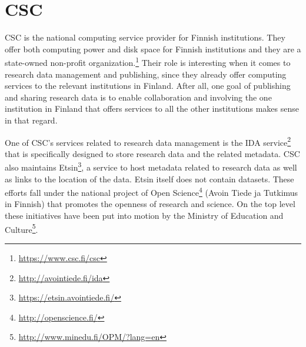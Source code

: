 \section{CSC}
\label{sec:csc}

CSC is the national computing service provider for Finnish institutions. They
offer both computing power and disk space for Finnish institutions and they
are a state-owned non-profit organization.\footnote{\url{https://www.csc.fi/csc}}
Their role is interesting when it comes to research data management and
publishing, since they already offer computing services to the relevant
institutions in Finland. After all, one goal of publishing and sharing
research data is to enable collaboration and involving the one institution
in Finland that offers services to all the other institutions makes sense in
that regard.

One of CSC's services related to research data management is the IDA
service\footnote{\url{http://avointiede.fi/ida}} that is specifically
designed to store research data and the related metadata. CSC also maintains
Etsin\footnote{\url{https://etsin.avointiede.fi/}}, a service to host
metadata related to research data as well as links to the location of the data.
Etsin itself does not contain datasets.
These efforts fall under the national project of Open
Science\footnote{\url{http://openscience.fi/}} (Avoin Tiede ja Tutkimus in
Finnish) that promotes the openness of research and science. On the top level
these initiatives have been put into motion by the Ministry of Education and
Culture\footnote{\url{http://www.minedu.fi/OPM/?lang=en}}.

